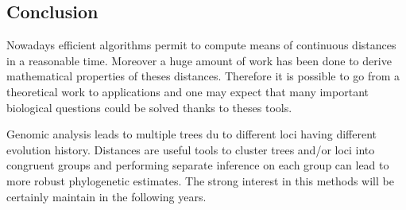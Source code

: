 \subsection{Conclusion}

Nowadays efficient algorithms permit to compute means of continuous distances in a reasonable time. Moreover a huge amount of work has been done to derive mathematical properties of theses distances. Therefore it is possible to go from a theoretical work to applications and one may expect that many important biological questions could be solved thanks to theses tools.

Genomic analysis leads to multiple trees du to different loci having different evolution history. Distances are useful tools to cluster trees and/or loci into congruent groups and performing separate inference on each group can lead to more robust phylogenetic estimates.
The strong interest in this methods will be certainly maintain  in the following years.
 